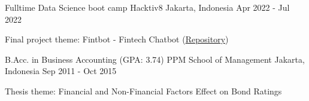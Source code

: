 

\begin{cventries}

  \cventry
    {Fulltime Data Science boot camp} %
    {Hacktiv8} %
    {Jakarta, Indonesia} %
    {Apr 2022 - Jul 2022} %
    {
      \begin{cvitems} %
        \item {Final project theme: Fintbot - Fintech Chatbot (\href{https://github.com/H8-Assignments-Bay/p2---final-project-group-003}{Repository})}
      \end{cvitems}
    }

  \cventry
    {B.Acc. in Business Accounting (GPA: 3.74)} %
    {PPM School of Management} %
    {Jakarta, Indonesia} %
    {Sep 2011 - Oct 2015} %
    {
      \begin{cvitems} %
        \item {Thesis theme: Financial and Non-Financial Factors Effect on Bond Ratings}
      \end{cvitems}
    }

\end{cventries}
